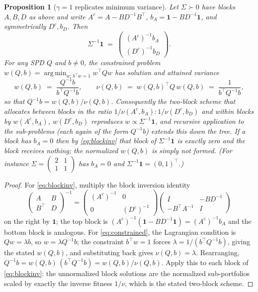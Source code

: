 \documentclass[11pt]{article}
\newtheorem{proposition}{Proposition}
\theoremstyle{remark}
\DeclareMathOperator*{\argminop}{arg\,min}
\begin{document}
\begin{proposition}[$\gamma = 1$ replicates minimum variance]
\label{prop:minvar}
Let $\Sigma \succ 0$ have blocks $A, B, D$ as above and write
$A^c = A - BD^{-1}B^\top$, $b_A = \mathbf{1} - BD^{-1}\mathbf{1}$, and
symmetrically $D^c, b_D$. Then
\begin{equation}
  \Sigma^{-1}\mathbf{1}
  \;=\;
  \begin{pmatrix} (A^c)^{-1} b_A \\ (D^c)^{-1} b_D \end{pmatrix}.
  \label{eq:blockinv}
\end{equation}
For any SPD $Q$ and $b \ne 0$, the constrained problem
$w(Q,b) = \argminop_{w :\, b^\top w = 1} w^\top Q w$ has solution and
attained variance
\begin{equation}
  w(Q, b) \;=\; \frac{Q^{-1}b}{b^\top Q^{-1} b},
  \qquad
  \nu(Q, b) \;=\; w(Q,b)^\top Q\, w(Q,b) \;=\; \frac{1}{b^\top Q^{-1} b},
  \label{eq:constrained}
\end{equation}
so that $Q^{-1}b = w(Q,b)/\nu(Q,b)$. Consequently the two-block scheme that
allocates between blocks in the ratio $1/\nu(A^c,b_A) : 1/\nu(D^c,b_D)$ and
within blocks by $w(A^c,b_A)$, $w(D^c,b_D)$ reproduces
$w \propto \Sigma^{-1}\mathbf{1}$, and recursive application to the
sub-problems (each again of the form $Q^{-1}b$) extends this down the tree.
If a block has $b_A = 0$ then by \eqref{eq:blockinv} that block of
$\Sigma^{-1}\mathbf{1}$ is exactly zero and the block receives nothing; the
normalized $w(Q,b)$ is simply not formed. (For instance
$\Sigma = \left(\begin{smallmatrix}2&1\\1&1\end{smallmatrix}\right)$ has
$b_A = 0$ and $\Sigma^{-1}\mathbf{1} = (0, 1)^\top$.)
\end{proposition}
\begin{proof}
For \eqref{eq:blockinv}, multiply the block inversion identity
\[
  \begin{pmatrix} A & B \\ B^\top & D \end{pmatrix}^{-1}
  =
  \begin{pmatrix} (A^c)^{-1} & 0 \\ 0 & (D^c)^{-1} \end{pmatrix}
  \begin{pmatrix} I & -BD^{-1} \\ -B^\top A^{-1} & I \end{pmatrix}
\]
on the right by $\mathbf{1}$; the top block is
$(A^c)^{-1}(\mathbf{1} - BD^{-1}\mathbf{1}) = (A^c)^{-1}b_A$ and the bottom
block is analogous. For \eqref{eq:constrained}, the Lagrangian condition is
$Qw = \lambda b$, so $w = \lambda Q^{-1}b$; the constraint $b^\top w = 1$
forces $\lambda = 1/(b^\top Q^{-1}b)$, giving the stated $w(Q,b)$, and
substituting back gives $\nu(Q,b) = \lambda$. Rearranging,
$Q^{-1}b = w(Q,b)\,(b^\top Q^{-1}b) = w(Q,b)/\nu(Q,b)$. Apply this to each
block of \eqref{eq:blockinv}: the unnormalized block solutions are the
normalized sub-portfolios scaled by exactly the inverse fitness $1/\nu$,
which is the stated two-block scheme.
\end{proof}
\end{document}
